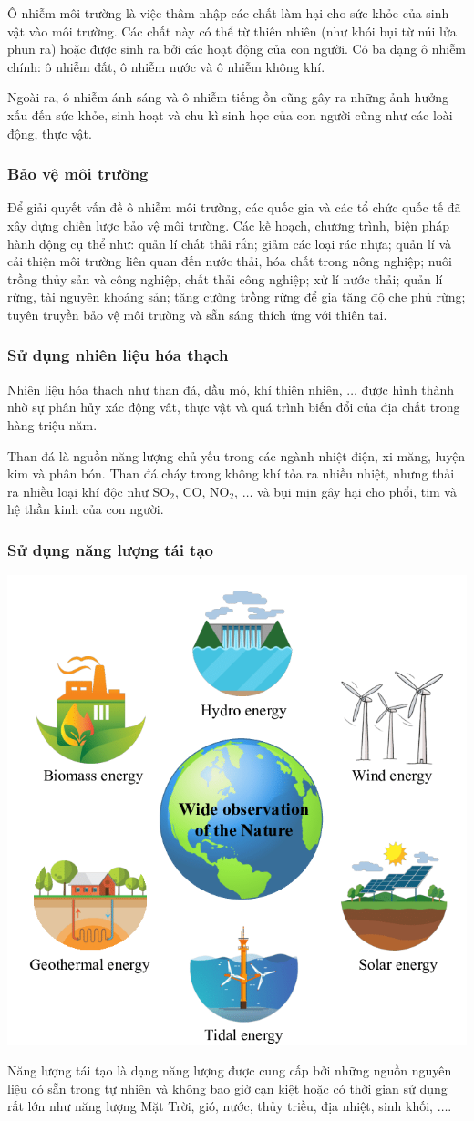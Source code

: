Ô nhiễm môi trường là việc thâm nhập các chất làm hại cho sức khỏe của sinh vật vào môi trường. Các chất này có thể từ thiên nhiên (như khói bụi từ núi lửa phun ra) hoặc được sinh ra bởi các hoạt động của con người. Có ba dạng ô nhiễm chính: ô nhiễm đất, ô nhiễm nước và ô nhiễm không khí.

Ngoài ra, ô nhiễm ánh sáng và ô nhiễm tiếng ồn cũng gây ra những ảnh hưởng xấu đến sức khỏe, sinh hoạt và chu kì sinh học của con người cũng như các loài động, thực vật.
\subsubsection{Bảo vệ môi trường}
Để giải quyết vấn đề ô nhiễm môi trường, các quốc gia và các tổ chức quốc tế đã xây dựng chiến lược bảo vệ môi trường. Các kế hoạch, chương trình, biện pháp hành động cụ thể như: quản lí chất thải rắn; giảm các loại rác nhựa; quản lí và cải thiện môi trường liên quan đến nước thải, hóa chất trong nông nghiệp; nuôi trồng thủy sản và công nghiệp, chất thải công nghiệp; xử lí nước thải; quản lí rừng, tài nguyên khoáng sản; tăng cường trồng rừng để gia tăng độ che phủ rừng; tuyên truyền bảo vệ môi trường và sẵn sáng thích ứng với thiên tai.

\subsubsection{Sử dụng nhiên liệu hóa thạch}
Nhiên liệu hóa thạch như than đá, dầu mỏ, khí thiên nhiên, $\ldots$ được hình thành nhờ sự phân hủy xác động vât, thực vật và quá trình biến đổi của địa chất trong hàng triệu năm.

Than đá là nguồn năng lượng chủ yếu trong các ngành nhiệt điện, xi măng, luyện kim và phân bón. Than đá cháy trong không khí tỏa ra nhiều nhiệt, nhưng thải ra nhiều loại khí độc như SO$_2$, CO, NO$_2$, $\ldots$ và bụi mịn gây hại cho phổi, tim và hệ thần kinh của con người.
\subsubsection{Sử dụng năng lượng tái tạo}
\begin{center}
	\includegraphics[width=0.5\linewidth]{../figs/G10-036-1.png}
\end{center}
Năng lượng tái tạo là dạng năng lượng được cung cấp bởi những nguồn nguyên liệu có sẵn trong tự nhiên và không bao giờ cạn kiệt hoặc có thời gian sử dụng rất lớn như năng lượng Mặt Trời, gió, nước, thủy triều, địa nhiệt, sinh khối, $\ldots$.

